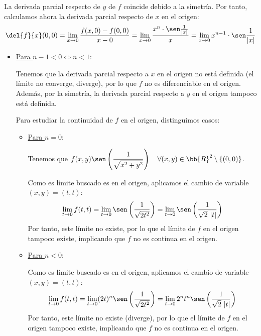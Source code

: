 \begin{ejercicio}
    La derivada parcial respecto de $y$ de $f$ coincide debido a la simetría. Por tanto, calculamos ahora la derivada parcial respecto de $x$ en el origen:
    \begin{equation*}
        \del{f}{x}(0,0) = \lim_{x\to 0} \frac{f(x,0) - f(0,0)}{x-0}
        = \lim_{x\to 0} \frac{x^n \cdot \sen\frac{1}{|x|}}{x}
        = \lim_{x\to 0} x^{n-1} \cdot \sen\frac{1}{|x|}
    \end{equation*}

    \begin{itemize}
        \item \ul{Para $n-1<0 \Longleftrightarrow n<1$}:

        Tenemos que la derivada parcial respecto a $x$ en el origen no está definida (el límite no converge, diverge), por lo que $f$ no es diferenciable en el origen. Además, por la simetría, la derivada parcial respecto a $y$ en el origen tampoco está definida.

        Para estudiar la continuidad de $f$ en el origen, distinguimos casos:
        \begin{itemize}
            \item \ul{Para $n=0$}:
            
            Tenemos que $\displaystyle f(x,y)\sen\left(\frac{1}{\sqrt{x^2+y^2}}\right) \quad \forall (x,y) \in \bb{R}^2\setminus\{(0,0)\}$.

            Como es límite buscado es en el origen, aplicamos el cambio de variable $(x,y)=(t,t)$:
            \begin{equation*}
                \lim_{t\to 0} f(t,t) = \lim_{t\to 0}\sen\left(\frac{1}{\sqrt{2t^2}}\right)
                = \lim_{t\to 0}\sen\left(\frac{1}{\sqrt{2}~|t|}\right)
            \end{equation*}
            Por tanto, este límite no existe, por lo que el límite de $f$ en el origen tampoco existe, implicando que $f$ no es continua en el origen.

            \item \ul{Para $n<0$}:
            
            Como es límite buscado es en el origen, aplicamos el cambio de variable $(x,y)=(t,t)$:
            \begin{equation*}
                \lim_{t\to 0} f(t,t) = \lim_{t\to 0}(2t)^n\sen\left(\frac{1}{\sqrt{2t^2}}\right)
                = \lim_{t\to 0}2^nt^n\sen\left(\frac{1}{\sqrt{2}~|t|}\right)
            \end{equation*}
            Por tanto, este límite no existe (diverge), por lo que el límite de $f$ en el origen tampoco existe, implicando que $f$ no es continua en el origen.
        \end{itemize}


\end{itemize}
\end{ejercicio}
